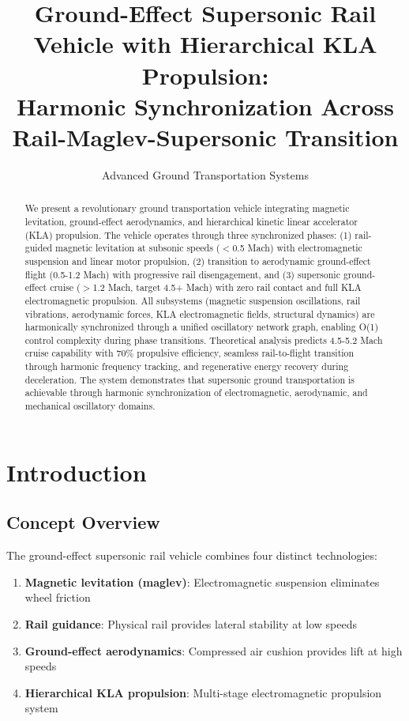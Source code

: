 \documentclass[12pt,a4paper]{article}
\title{Ground-Effect Supersonic Rail Vehicle with Hierarchical KLA Propulsion:\\
Harmonic Synchronization Across Rail-Maglev-Supersonic Transition}
\author{Advanced Ground Transportation Systems}
\begin{document}
\maketitle

\begin{abstract}
We present a revolutionary ground transportation vehicle integrating magnetic levitation, ground-effect aerodynamics, and hierarchical kinetic linear accelerator (KLA) propulsion. The vehicle operates through three synchronized phases: (1) rail-guided magnetic levitation at subsonic speeds ($<$0.5 Mach) with electromagnetic suspension and linear motor propulsion, (2) transition to aerodynamic ground-effect flight (0.5-1.2 Mach) with progressive rail disengagement, and (3) supersonic ground-effect cruise ($>$1.2 Mach, target 4.5+ Mach) with zero rail contact and full KLA electromagnetic propulsion. All subsystems (magnetic suspension oscillations, rail vibrations, aerodynamic forces, KLA electromagnetic fields, structural dynamics) are harmonically synchronized through a unified oscillatory network graph, enabling O(1) control complexity during phase transitions. Theoretical analysis predicts 4.5-5.2 Mach cruise capability with 70\% propulsive efficiency, seamless rail-to-flight transition through harmonic frequency tracking, and regenerative energy recovery during deceleration. The system demonstrates that supersonic ground transportation is achievable through harmonic synchronization of electromagnetic, aerodynamic, and mechanical oscillatory domains.
\end{abstract}

\section{Introduction}

\subsection{Concept Overview}

The ground-effect supersonic rail vehicle combines four distinct technologies:

\begin{enumerate}
\item \textbf{Magnetic levitation (maglev)}: Electromagnetic suspension eliminates wheel friction
\item \textbf{Rail guidance}: Physical rail provides lateral stability at low speeds
\item \textbf{Ground-effect aerodynamics}: Compressed air cushion provides lift at high speeds
\item \textbf{Hierarchical KLA propulsion}: Multi-stage electromagnetic propulsion system
\end{enumerate}
\end{document}
